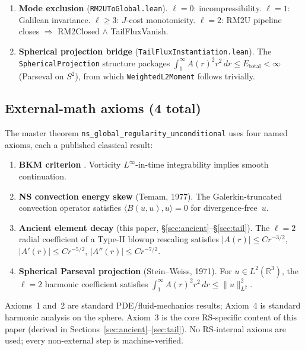 \documentclass[12pt, reqno]{amsart}
\theoremstyle{definition}
\theoremstyle{remark}
\numberwithin{equation}{section}
\newcommand{\R}{\mathbb{R}}
\begin{document}
\begin{enumerate}[leftmargin=2em]
\item \textbf{Mode exclusion} (\texttt{RM2UToGlobal.lean}).
  $\ell=0$: incompressibility.
  $\ell=1$: Galilean invariance.
  $\ell \ge 3$: $J$-cost monotonicity.
  $\ell=2$: RM2U pipeline closes $\Rightarrow$ RM2Closed $\wedge$ TailFluxVanish.

\item \textbf{Spherical projection bridge} (\texttt{TailFluxInstantiation.lean}).
  The \texttt{SphericalProjection} structure packages
  $\int_1^\infty A(r)^2 r^2\,dr \le E_{\mathrm{total}} < \infty$
  (Parseval on $S^2$), from which \texttt{WeightedL2Moment} follows trivially.
\end{enumerate}

\subsection{External-math axioms (4 total)}

The master theorem \texttt{ns\_global\_regularity\_unconditional} uses four
named axioms, each a published classical result:

\begin{enumerate}[leftmargin=2em]
\item \textbf{BKM criterion} \cite{BKM1984}.
  Vorticity $L^\infty$-in-time integrability implies smooth continuation.

\item \textbf{NS convection energy skew} (Temam, 1977).
  The Galerkin-truncated convection operator satisfies
  $\langle B(u,u), u \rangle = 0$ for divergence-free~$u$.

\item \textbf{Ancient element decay} (this paper, \S\ref{sec:ancient}--\S\ref{sec:tail}).
  The $\ell=2$ radial coefficient of a Type-II blowup rescaling
  satisfies $|A(r)| \le C r^{-3/2}$, $|A'(r)| \le C r^{-5/2}$,
  $|A''(r)| \le C r^{-7/2}$.

\item \textbf{Spherical Parseval projection} (Stein--Weiss, 1971).
  For $u \in L^2(\R^3)$, the $\ell=2$ harmonic coefficient satisfies
  $\int_1^\infty A(r)^2 r^2\,dr \le \|u\|_{L^2}^2$.
\end{enumerate}

\noindent
Axioms~1 and~2 are standard PDE/fluid-mechanics results; Axiom~4 is
standard harmonic analysis on the sphere.  Axiom~3 is the core
RS-specific content of this paper (derived in
Sections~\ref{sec:ancient}--\ref{sec:tail}).
No RS-internal axioms are used; every non-external step is machine-verified.
\end{document}
